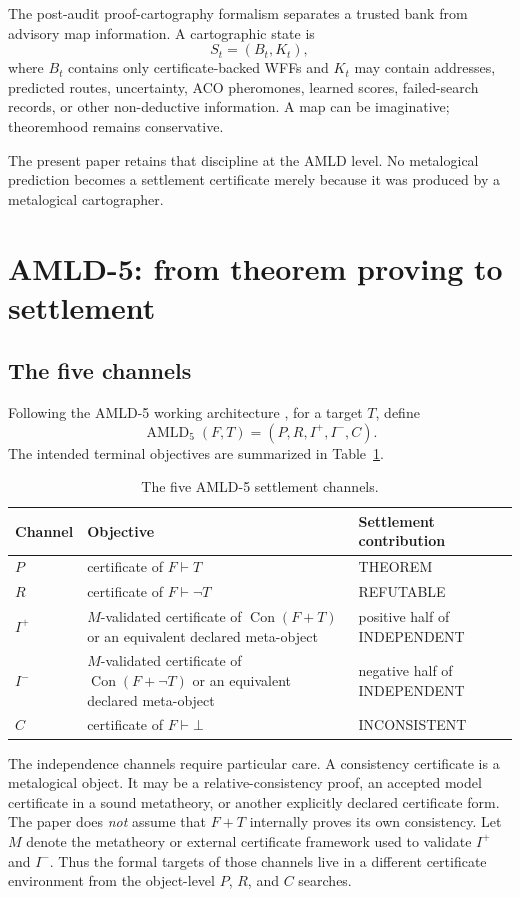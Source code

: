 \documentclass[11pt]{article}
\newcommand{\Con}{\operatorname{Con}}
\begin{document}
The post-audit proof-cartography formalism \cite{ProofCartography} separates a trusted bank from advisory map information. A cartographic state is
\[
S_t=(B_t,K_t),
\]
where $B_t$ contains only certificate-backed WFFs and $K_t$ may contain addresses, predicted routes, uncertainty, ACO pheromones, learned scores, failed-search records, or other non-deductive information. A map can be imaginative; theoremhood remains conservative.

The present paper retains that discipline at the AMLD level. No metalogical prediction becomes a settlement certificate merely because it was produced by a metalogical cartographer.

\section{AMLD-5: from theorem proving to settlement}

\subsection{The five channels}

Following the AMLD-5 working architecture \cite{AMLD5}, for a target $T$, define
\[
\operatorname{AMLD}_5(F,T)=(P,R,I^+,I^-,C).
\]
The intended terminal objectives are summarized in Table~\ref{tab:roles}.

\begin{table}[h]
\centering
\caption{The five AMLD-5 settlement channels.}
\label{tab:roles}
\small
\begin{tabular}{@{}p{}p{}p{}@{}}
\toprule
Channel & Objective & Settlement contribution \\
\midrule
$P$ & certificate of $F\vdash T$ & THEOREM \\
$R$ & certificate of $F\vdash\neg T$ & REFUTABLE \\
$I^+$ & $M$-validated certificate of $\Con(F+T)$ or an equivalent declared meta-object & positive half of INDEPENDENT \\
$I^-$ & $M$-validated certificate of $\Con(F+\neg T)$ or an equivalent declared meta-object & negative half of INDEPENDENT \\
$C$ & certificate of $F\vdash\bot$ & INCONSISTENT \\
\bottomrule
\end{tabular}
\end{table}

The independence channels require particular care. A consistency certificate is a metalogical object. It may be a relative-consistency proof, an accepted model certificate in a sound metatheory, or another explicitly declared certificate form. The paper does \emph{not} assume that $F+T$ internally proves its own consistency. Let $M$ denote the metatheory or external certificate framework used to validate $I^+$ and $I^-$. Thus the formal targets of those channels live in a different certificate environment from the object-level $P$, $R$, and $C$ searches.
\end{document}
